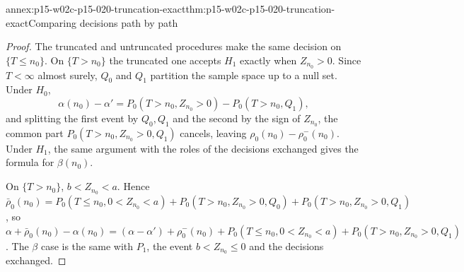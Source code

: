 \begin{annexitem}{annex:p15-w02c-p15-020-truncation-exact}{thm:p15-w02c-p15-020-truncation-exact}{Comparing decisions path by path}
\begin{proof}
The truncated and untruncated procedures make the same decision on
\(\{T\leq n_0\}\). On \(\{T>n_0\}\) the truncated one accepts \(H_1\)
exactly when \(Z_{n_0}>0\). Since \(T<\infty\) almost surely, \(Q_0\)
and \(Q_1\) partition the sample space up to a null set. Under \(H_0\),
\[
 \alpha(n_0)-\alpha'
 =P_0(T>n_0,Z_{n_0}>0)-P_0(T>n_0,Q_1),
\]
and splitting the first event by \(Q_0,Q_1\) and the second by the sign
of \(Z_{n_0}\), the common part \(P_0(T>n_0,Z_{n_0}>0,Q_1)\) cancels,
leaving \(\rho_0(n_0)-\rho_0^-(n_0)\). Under \(H_1\), the same argument
with the roles of the decisions exchanged gives the formula for
\(\beta(n_0)\).

On \(\{T>n_0\}\), \(b<Z_{n_0}<a\). Hence
\(\bar\rho_0(n_0)=P_0(T\leq n_0,0<Z_{n_0}<a)+P_0(T>n_0,Z_{n_0}>0,Q_0)+P_0(T>n_0,Z_{n_0}>0,Q_1)\),
so
\(\alpha+\bar\rho_0(n_0)-\alpha(n_0)=(\alpha-\alpha')+\rho_0^-(n_0)
+P_0(T\leq n_0,0<Z_{n_0}<a)+P_0(T>n_0,Z_{n_0}>0,Q_1)\). The
\(\beta\) case is the same with \(P_1\), the event \(b<Z_{n_0}\leq0\)
and the decisions exchanged.
\end{proof}
\end{annexitem}
